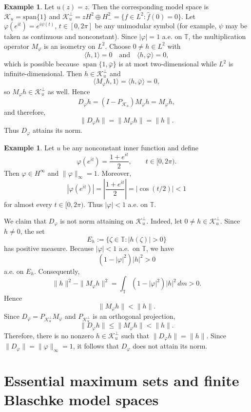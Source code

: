 \documentclass[12pt]{amsart}
\theoremstyle{definition}
\newtheorem{example}[theorem]{Example}
\theoremstyle{remark}
\def \T{\mathbb{T}}
\newcommand{\clk}{\mathcal{K}}
\newcommand{\vp}{\varphi}
\numberwithin{equation}{section}
\begin{document}
\begin{example}\label{ex:NA-u=z}
Let $u(z)=z$. Then the corresponding model space is $\clk_u=\mathrm{span}\{1\}$ and $\clk_u^\perp= zH^2\oplus H^2_{-}=\{f\in L^2:\widehat f(0)=0\}$.
Let $\vp(e^{it})=e^{i\psi(t)},\, t\in[0,2\pi]$ be any unimodular symbol (for example, $\psi$ may be taken as continuous and nonconstant). Since $|\vp|=1$ a.e. on $\T$, the multiplication operator $M_\vp$ is an isometry on $L^2$. Choose $0\neq h\in L^2$ with
\[\langle h,1\rangle=0 \quad\text{and}\quad \langle h,\bar{\vp}\rangle=0,\]
which is possible because $\operatorname{span}\{1,\bar{\vp}\}$ is at most two-dimensional while $L^2$ is infinite-dimensional.
Then $h\in \clk_u^\perp$ and
\[\langle M_\vp h,1\rangle=\langle h,\bar{\vp}\rangle=0,\]
so $M_\vp h\in \clk_u^\perp$ as well. Hence
\[D_\vp h=(I-P_{\clk_u})M_\vp h=M_\vp h,\]
and therefore,
\[\|D_\vp h\|=\|M_\vp h\|=\|h\|.\]
Thus $D_\vp$ attains its norm.

\end{example}



 

\begin{example}\label{ex:concrete-nonNA}
Let $u$ be any nonconstant inner function and define
\[
\vp(e^{it})=\frac{1+e^{it}}{2},\qquad t\in[0,2\pi).
\]
Then $\vp\in H^\infty$ and $\|\vp\|_\infty=1$. Moreover,
\[
|\vp(e^{it})|=\left|\frac{1+e^{it}}{2}\right|=|\cos(t/2)|<1
\]
for almost every $t\in[0,2\pi)$. Thus $|\vp|<1$ a.e. on $\T$.
	
We claim that $D_\vp$ is not norm attaining on $\clk_u^\perp$.
Indeed, let $0\neq h\in\clk_u^\perp$. Since $h\neq0$, the set
\[
E_h:=\{\zeta\in\T:|h(\zeta)|>0\}
\]
has positive measure. Because $|\vp|<1$ a.e.\ on $\T$, we have
\[
(1-|\vp|^2)|h|^2>0
\]
a.e. on $E_h$. Consequently,
\[
\|h\|^2-\|M_\vp h\|^2=\int_{\T}(1-|\vp|^2)|h|^2\,dm >0.
\]
Hence
\[
\|M_\vp h\|<\|h\|.
\]
Since $D_\vp=P_{\clk_u^\perp}M_\vp$ and $P_{\clk_u^\perp}$ is an orthogonal projection,
\[
\|D_\vp h\|\leq\|M_\vp h\|<\|h\|.
\]
Therefore, there is no nonzero $h\in\clk_u^\perp$ such that
$\|D_\vp h\|=\|h\|$. Since $\|D_\vp\|=\|\vp\|_\infty=1$, it follows that $D_\vp$ does not attain its norm.
\end{example}




\section{Essential maximum sets and finite Blaschke model spaces}
\label{sec:essential-maximum}
\end{document}
